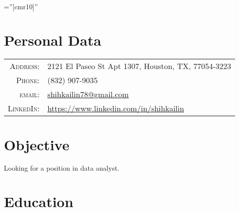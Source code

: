 \documentclass[11pt]{article} %
\begin{document}
\pagestyle{empty} %

\font\fb=''[cmr10]'' %


\par{\bigskip\par} %

\section{Personal Data}

\begin{tabular}{rl}
\textsc{Address:} & 2121 El Paseo St Apt 1307, Houston, TX, 77054-3223 \\
\textsc{Phone:} & (832) 907-9035 \\
\textsc{email:} & \href{mailto:shihkailin78@gmail.com}{shihkailin78@gmail.com} \\
\textsc{LinkedIn:} & \href{https://www.linkedin.com/in/shihkailin}{https://www.linkedin.com/in/shihkailin}
\end{tabular}


\section{Objective}
Looking for a position in data analyst.


\section{Education}
\end{document}
